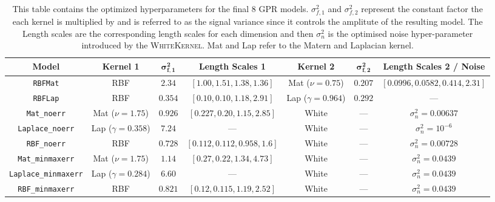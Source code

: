\documentclass{ucdgradtaughtthesis}
\begin{document}
\begin{table}[H]
\centering
\footnotesize  %
\renewcommand{\arraystretch}{1.15}  %
\setlength{\tabcolsep}{4pt}  %
{\fontsize{7}{8.5}\selectfont
\begin{tabular}{|c|c|c|c|c|c|c|}
\hline
\textbf{Model} & \textbf{Kernel 1} & $\mathbf{\sigma_{f,1}^2}$ & \textbf{Length Scales 1} & \textbf{Kernel 2} & $\mathbf{\sigma_{f,2}^2}$ & \textbf{Length Scales 2 / Noise} \\
\hline
\texttt{RBFMat} & RBF & $2.34$ & $[1.00, 1.51, 1.38, 1.36]$ & Mat ($\nu = 0.75$) & $0.207$ & $[0.0996, 0.0582, 0.414, 2.31]$ \\
\texttt{RBFLap} & RBF & $0.354$ & $[0.10, 0.10, 1.18, 2.91]$ & Lap ($\gamma = 0.964$) & $0.292$ & --- \\
\texttt{Mat\_noerr} & Mat ($\nu = 1.75$) & $0.926$ & $[0.227, 0.20, 1.15, 2.85]$ & White & --- & $\sigma_n^2 = 0.00637$ \\
\texttt{Laplace\_noerr} & Lap ($\gamma = 0.358$) & $7.24$ & --- & White & --- & $\sigma_n^2 = 10^{-6}$ \\
\texttt{RBF\_noerr} & RBF & $0.728$ & $[0.112, 0.112, 0.958, 1.6]$ & White & --- & $\sigma_n^2 = 0.00728$ \\
\texttt{Mat\_minmaxerr} & Mat ($\nu = 1.75$) & $1.14$ & $[0.27, 0.22, 1.34, 4.73]$ & White & --- & $\sigma_n^2 = 0.0439$ \\
\texttt{Laplace\_minmaxerr} & Lap ($\gamma = 0.284$) & $6.60$ & --- & White & --- & $\sigma_n^2 = 0.0439$ \\
\texttt{RBF\_minmaxerr} & RBF & $0.821$ & $[0.12, 0.115, 1.19, 2.52]$ & White & --- & $\sigma_n^2 = 0.0439$ \\
\hline
\end{tabular}}
\caption[The optimized hyperparameters for the final 8 GPR models.]{This table contains the optimized hyperparameters for the final 8 GPR models. $\sigma_{f,1}^2$ and $\sigma_{f,2}^2$ represent the constant factor the each kernel is multiplied by and is referred to as the signal variance since it controls the amplitute of the resulting model.
The Length scales are the corresponding length scales for each dimension and then $\sigma_n^2$ is the optimised noise hyper-parameter introduced by the \textsc{WhiteKernel}. Mat and Lap refer to the Matern and Laplacian kernel.}
\label{tab:final_gpr_hyperparams}
\end{table}
\end{document}
